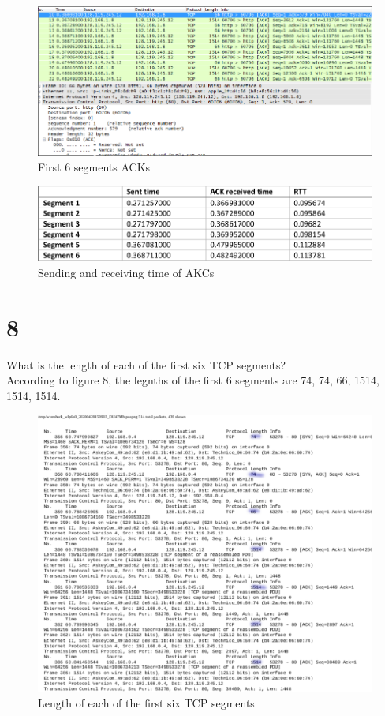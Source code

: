 \documentclass{article}
\begin{document}
\begin{figure}[h!]
\centering
\includegraphics[scale=0.4]{Q7b.png}
\caption{First 6 segments ACKs}
\end{figure}

\begin{figure}[h!]
\centering
\includegraphics[scale=0.4]{Q7c.png}
\caption{Sending and receiving time of AKCs}
\end{figure}
\clearpage

\section*{8}
What is the length of each of the first six TCP segments?\\
\newline According to figure 8, the legnths of the first 6 segments are 74, 74, 66, 1514, 1514, 1514.\\
\begin{figure}[h!]
\centering
\includegraphics[scale=0.5]{Q8.pdf}
\caption{Length of each of the first six TCP segments}
\end{figure}
\end{document}
